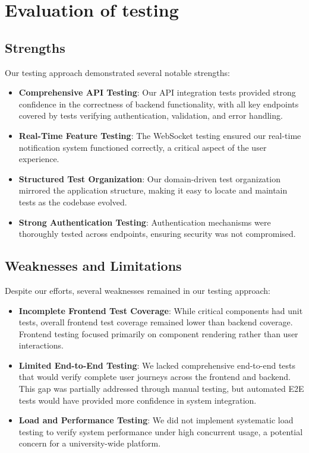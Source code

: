 \section{Evaluation of testing}
\label{sect:testing:evaluation}

\subsection{Strengths}

Our testing approach demonstrated several notable strengths:

\begin{itemize}
    \item \textbf{Comprehensive API Testing}: Our API integration tests provided strong confidence in the correctness of backend functionality, with all key endpoints covered by tests verifying authentication, validation, and error handling.
    
    \item \textbf{Real-Time Feature Testing}: The WebSocket testing ensured our real-time notification system functioned correctly, a critical aspect of the user experience.
    
    \item \textbf{Structured Test Organization}: Our domain-driven test organization mirrored the application structure, making it easy to locate and maintain tests as the codebase evolved.
    
    \item \textbf{Strong Authentication Testing}: Authentication mechanisms were thoroughly tested across endpoints, ensuring security was not compromised.
\end{itemize}

\subsection{Weaknesses and Limitations}

Despite our efforts, several weaknesses remained in our testing approach:

\begin{itemize}
    \item \textbf{Incomplete Frontend Test Coverage}: While critical components had unit tests, overall frontend test coverage remained lower than backend coverage. Frontend testing focused primarily on component rendering rather than user interactions.
    
    \item \textbf{Limited End-to-End Testing}: We lacked comprehensive end-to-end tests that would verify complete user journeys across the frontend and backend. This gap was partially addressed through manual testing, but automated E2E tests would have provided more confidence in system integration.
    
    \item \textbf{Load and Performance Testing}: We did not implement systematic load testing to verify system performance under high concurrent usage, a potential concern for a university-wide platform.
\end{itemize}

